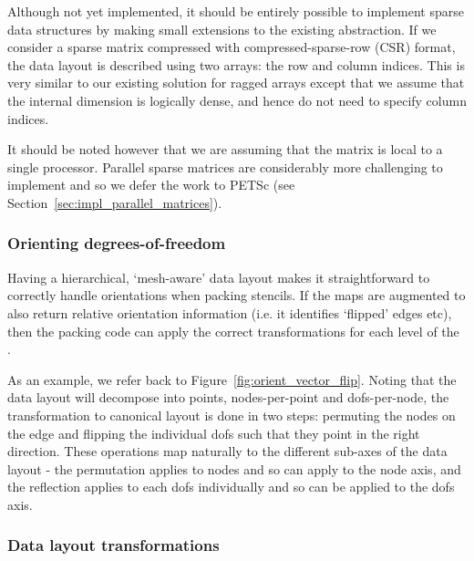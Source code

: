 Although not yet implemented, it should be entirely possible to implement sparse data structures by making small extensions to the existing abstraction.
If we consider a sparse matrix compressed with compressed-sparse-row (CSR) format, the data layout is described using two arrays: the row and column indices.
This is very similar to our existing solution for ragged arrays except that we assume that the internal dimension is logically dense, and hence do not need to specify column indices.

It should be noted however that we are assuming that the matrix is local to a single processor.
Parallel sparse matrices are considerably more challenging to implement and so we defer the work to PETSc (see Section~\ref{sec:impl_parallel_matrices}).

\subsubsection{Orienting degrees-of-freedom}
\label{sec:impl_orientation}


Having a hierarchical, `mesh-aware' data layout makes it straightforward to correctly handle orientations when packing stencils.
If the maps are augmented to also return relative orientation information (i.e. it identifies `flipped' edges etc), then the packing code can apply the correct transformations for each level of the .

As an example, we refer back to Figure~\ref{fig:orient_vector_flip}.
Noting that the data layout will decompose into points, nodes-per-point and \glspl{dof}-per-node, the transformation to canonical layout is done in two steps: permuting the nodes on the edge and flipping the individual \glspl{dof} such that they point in the right direction.
These operations map naturally to the different sub-axes of the data layout - the permutation applies to nodes and so can apply to the node axis, and the reflection applies to each \glspl{dof} individually and so can be applied to the \glspl{dof} axis.

\subsubsection{Data layout transformations}
\label{sec:impl_datalayoutopt}


